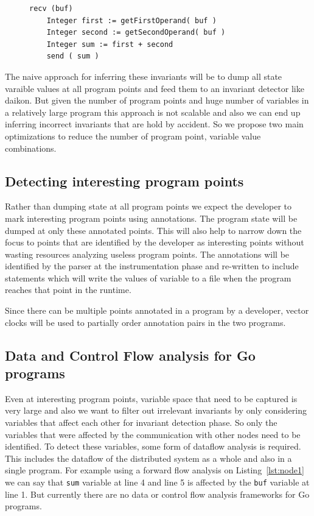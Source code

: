 \begin{figure}
\begin{lstlisting}[caption={Sample code for Communication between 2 nodes - Node 1}, label=lst:node1]
    recv (buf)
    Integer first := getFirstOperand( buf )
    Integer second := getSecondOperand( buf )
    Integer sum := first + second
    send ( sum )
\end{lstlisting}
\end{figure}

The naive approach for inferring these invariants will be to dump all
state varaible values at all program points and feed them to an
invariant detector like daikon\cite{ernst2007daikon}. But given the
number of program points and huge number of variables in a relatively
large program this approach is not scalable and also we can end up inferring incorrect invariants that are hold by accident. So we propose two main
optimizations to reduce the number of program point, variable value
combinations.

\subsection{Detecting interesting program points}

Rather than dumping state at all program points we expect the
developer to mark interesting program points using annotations. The
program state will be dumped at only these annotated points. This will
also help to narrow down the focus to points that are identified by
the developer as interesting points without wasting resources
analyzing useless program points. The annotations will be identified
by the parser at the instrumentation phase and re-written to include
statements which will write the values of variable to a file when the
program reaches that point in the runtime.

Since there can be multiple points annotated in a program by a
developer, vector clocks will be used to partially order annotation
pairs in the two programs.%

\subsection{Data and Control Flow analysis for Go programs}

Even at interesting program points, variable space that need to be
captured is very large and also we want to filter out irrelevant invariants by only considering variables that affect each other for invariant detection phase. So only the variables that were affected by
the communication with other nodes need to be identified. To detect
these variables, some form of dataflow analysis is required. This
includes the dataflow of the distributed system as a whole and also in
a single program. For example using a forward flow analysis on Listing~\ref{lst:node1} we can say that \texttt{sum} variable at line 4 and line 5 is affected by the \texttt{buf} variable at line 1. But currently there are no data or control flow analysis
frameworks for Go programs.

